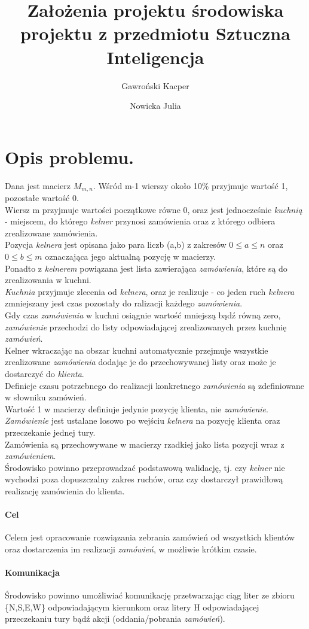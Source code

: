 \documentclass[11pt]{article}
\title{Założenia projektu środowiska projektu z przedmiotu Sztuczna Inteligencja}
\author{
  Gawroński Kacper
  \and
  Nowicka Julia
}
\begin{document}
\maketitle
\section{Opis problemu.}
Dana jest macierz $M_{m,n}$. Wśród m-1 wierszy około 10\% przyjmuje wartość 1, pozostałe wartość 0.\\
Wiersz m przyjmuje wartości początkowe równe 0, oraz jest jednocześnie \textit{kuchnią} - miejscem, do którego \textit{kelner} przynosi zamówienia oraz z którego odbiera zrealizowane zamówienia.\\
Pozycja \textit{kelnera} jest opisana jako para liczb (a,b) z zakresów $0\le a \le n$ oraz $0\le b \le m$ oznaczająca jego aktualną pozycję w macierzy.\\
Ponadto z \textit{kelnerem} powiązana jest lista zawierająca \textit{zamówienia}, które są do zrealizowania w kuchni.\\
\textit{Kuchnia} przyjmuje zlecenia od \textit{kelnera}, oraz je realizuje - co jeden ruch \textit{kelnera} zmniejszany jest czas pozostały do ralizacji każdego \textit{zamówienia}.\\
Gdy czas \textit{zamówienia} w kuchni osiągnie wartość mniejszą bądź równą zero, \textit{zamówienie} przechodzi do listy odpowiadającej zrealizowanych przez kuchnię \textit{zamówień}.\\
Kelner wkraczając na obszar kuchni automatycznie przejmuje wszystkie zrealizowane \textit{zamówienia} dodając je do przechowywanej listy oraz może je dostarczyć do \textit{klienta}.\\
Definicje czasu potrzebnego do realizacji konkretnego \textit{zamówienia} są zdefiniowane w słowniku zamówień.\\
Wartość 1 w macierzy definiuje jedynie pozycję klienta, nie \textit{zamówienie}. \textit{Zamówienie} jest ustalane losowo po wejściu \textit{kelnera} na pozycję klienta oraz przeczekanie jednej tury.\\
Zamówienia są przechowywane w macierzy rzadkiej jako lista pozycji wraz z \textit{zamówieniem}.\\
Środowisko powinno przeprowadzać podstawową walidację, tj. czy \textit{kelner} nie wychodzi poza dopuszczalny zakres ruchów, oraz czy dostarczył prawidłową realizację zamówienia do klienta.\\
\paragraph{Cel}
Celem jest opracowanie rozwiązania zebrania zamówień od wszystkich klientów oraz dostarczenia im realizacji \textit{zamówień}, w możliwie krótkim czasie.
\paragraph{Komunikacja}
Środowisko powinno umożliwiać komunikację przetwarzając ciąg liter ze zbioru \{N,S,E,W\} odpowiadającym kierunkom oraz litery H odpowiadającej przeczekaniu tury bądź akcji (oddania/pobrania \textit{zamówień}).\\
\end{document}
